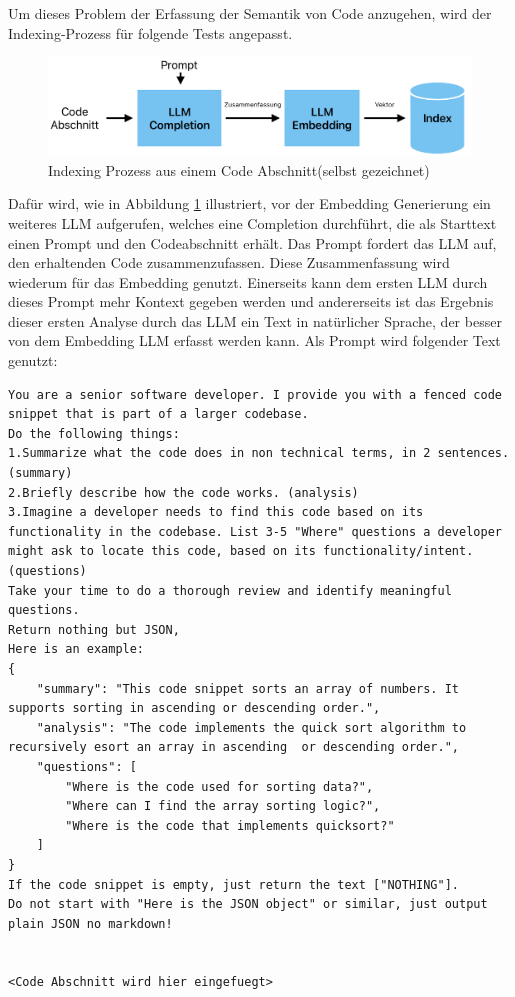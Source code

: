 \documentclass[../main.tex]{subfiles}
\begin{document}
Um dieses Problem der Erfassung der Semantik von Code anzugehen, wird der Indexing-Prozess für folgende Tests angepasst.

\begin{figure}[H]
    \centering
    \includegraphics[scale=.6]{"bilder/prozess.png"}
    \caption{Indexing Prozess aus einem Code Abschnitt(selbst gezeichnet)}
    \label{fig:indexing}
\end{figure}
Dafür wird, wie in Abbildung \ref{fig:indexing} illustriert, vor der Embedding Generierung ein weiteres \gls{LLM} aufgerufen, welches eine Completion durchführt, die als Starttext einen Prompt und den Codeabschnitt erhält.
Das Prompt fordert das \gls{LLM} auf, den erhaltenden Code zusammenzufassen. Diese Zusammenfassung wird wiederum für das Embedding genutzt.
Einerseits kann dem ersten \gls{LLM} durch dieses Prompt mehr Kontext gegeben werden und andererseits ist das Ergebnis dieser ersten Analyse durch das \gls{LLM} ein Text in natürlicher Sprache, der besser von dem Embedding \gls{LLM} erfasst werden kann.
Als Prompt wird folgender Text genutzt:

\begin{lstlisting}
You are a senior software developer. I provide you with a fenced code snippet that is part of a larger codebase.
Do the following things:
1.Summarize what the code does in non technical terms, in 2 sentences.(summary)
2.Briefly describe how the code works. (analysis)
3.Imagine a developer needs to find this code based on its functionality in the codebase. List 3-5 "Where" questions a developer might ask to locate this code, based on its functionality/intent. (questions)
Take your time to do a thorough review and identify meaningful questions.
Return nothing but JSON,
Here is an example:
{
    "summary": "This code snippet sorts an array of numbers. It supports sorting in ascending or descending order.", 
    "analysis": "The code implements the quick sort algorithm to recursively esort an array in ascending  or descending order.",
    "questions": [
        "Where is the code used for sorting data?",
        "Where can I find the array sorting logic?",
        "Where is the code that implements quicksort?"
    ]
}
If the code snippet is empty, just return the text ["NOTHING"].
Do not start with "Here is the JSON object" or similar, just output plain JSON no markdown!


<Code Abschnitt wird hier eingefuegt>
\end{lstlisting}
\end{document}
